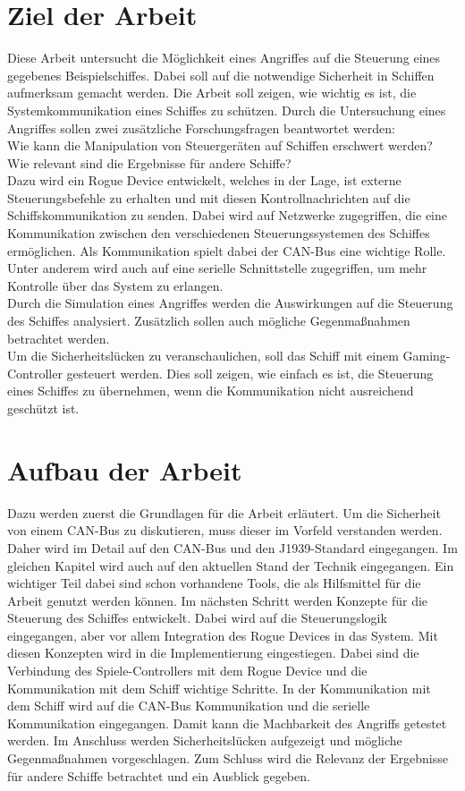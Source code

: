 \section{Ziel der Arbeit}
Diese Arbeit untersucht die Möglichkeit eines Angriffes auf die Steuerung eines gegebenes Beispielschiffes.
Dabei soll auf die notwendige Sicherheit in Schiffen aufmerksam gemacht werden.
Die Arbeit soll zeigen, wie wichtig es ist, die Systemkommunikation eines Schiffes zu schützen.
Durch die Untersuchung eines Angriffes sollen zwei zusätzliche Forschungsfragen beantwortet werden: \\
Wie kann die Manipulation von Steuergeräten auf Schiffen erschwert werden? \\
Wie relevant sind die Ergebnisse für andere Schiffe? \\
Dazu wird ein Rogue Device entwickelt, welches in der 
Lage, ist externe Steuerungsbefehle zu erhalten und mit diesen Kontrollnachrichten auf die Schiffskommunikation zu senden.
Dabei wird auf Netzwerke zugegriffen, die eine Kommunikation zwischen den verschiedenen Steuerungssystemen des Schiffes 
ermöglichen. Als Kommunikation spielt dabei der CAN-Bus eine wichtige Rolle.
Unter anderem wird auch 
auf eine serielle Schnittstelle zugegriffen, um mehr Kontrolle über das System zu erlangen. \\
Durch die Simulation eines Angriffes werden die Auswirkungen auf die Steuerung des 
Schiffes analysiert. Zusätzlich 
sollen auch mögliche Gegenmaßnahmen betrachtet werden. \\
Um die Sicherheitslücken zu veranschaulichen, soll das Schiff mit einem Gaming-Controller gesteuert werden.
Dies soll zeigen, wie einfach es ist, die Steuerung eines Schiffes zu übernehmen, wenn die Kommunikation nicht 
ausreichend geschützt ist.\\

\section{Aufbau der Arbeit}
Dazu werden zuerst die Grundlagen für die Arbeit erläutert. 
Um die Sicherheit von einem CAN-Bus zu diskutieren, muss dieser im Vorfeld verstanden werden. Daher wird
im Detail auf den CAN-Bus und den J1939-Standard eingegangen.
Im gleichen Kapitel wird auch auf den aktuellen Stand der Technik eingegangen.
Ein wichtiger Teil dabei sind schon vorhandene Tools, die als Hilfsmittel für die Arbeit genutzt werden können.
Im nächsten Schritt werden Konzepte für die Steuerung des Schiffes entwickelt. Dabei wird auf die Steuerungslogik eingegangen, aber
vor allem Integration des Rogue Devices in das System. Mit diesen Konzepten wird in die Implementierung eingestiegen. Dabei sind 
die Verbindung des Spiele-Controllers mit dem Rogue Device und die Kommunikation mit dem Schiff wichtige Schritte.
In der Kommunikation mit dem Schiff wird auf die CAN-Bus Kommunikation und die serielle Kommunikation eingegangen.
Damit kann die Machbarkeit des Angriffs getestet werden. Im Anschluss werden Sicherheitslücken aufgezeigt und mögliche Gegenmaßnahmen
vorgeschlagen. Zum Schluss wird die Relevanz der Ergebnisse für andere Schiffe betrachtet und ein Ausblick gegeben. \\
